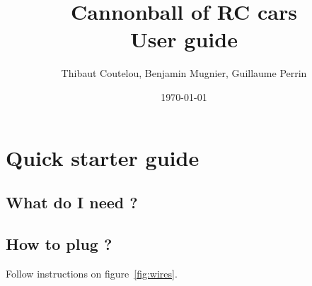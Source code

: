 \documentclass[a4paper,11pt]{report}
\title{Cannonball of RC cars\\User guide}
\author{Thibaut Coutelou, Benjamin Mugnier, Guillaume Perrin}
\date{\today}
\begin{document}
 \maketitle \tableofcontents

\setlength{\parskip}{3mm}










\chapter{Quick starter guide}

\section{What do I need ?}

\section{How to plug ?}

Follow instructions on figure~\ref{fig:wires}.
\end{document}
